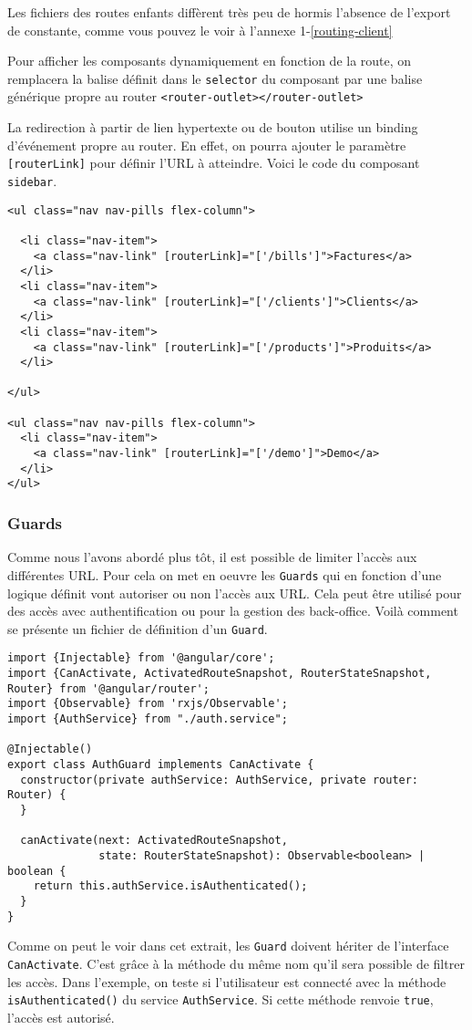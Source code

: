 \vspace{1.2ex}
Les fichiers des routes enfants diffèrent très peu de hormis l'absence de l'export de constante, comme vous pouvez le voir à l'annexe 1-\ref{routing-client}

Pour afficher les composants dynamiquement en fonction de la route, on remplacera la balise définit dans le \texttt{selector} du composant par une balise générique propre au router \texttt{<router-outlet></router-outlet>}

La redirection à partir de lien hypertexte ou de bouton utilise un binding d'événement propre au router. En effet, on pourra ajouter le paramètre \texttt{[routerLink]} pour définir l'URL à atteindre. Voici le code du composant \texttt{sidebar}.
\begin{lstlisting}[style=htmlcssjs, caption={routerLink}, label=routerLink]
<ul class="nav nav-pills flex-column">

  <li class="nav-item">
    <a class="nav-link" [routerLink]="['/bills']">Factures</a>
  </li>
  <li class="nav-item">
    <a class="nav-link" [routerLink]="['/clients']">Clients</a>
  </li>
  <li class="nav-item">
    <a class="nav-link" [routerLink]="['/products']">Produits</a>
  </li>

</ul>

<ul class="nav nav-pills flex-column">
  <li class="nav-item">
    <a class="nav-link" [routerLink]="['/demo']">Demo</a>
  </li>
</ul>\end{lstlisting}

\subsubsection{Guards}
Comme nous l'avons abordé plus tôt, il est possible de limiter l'accès aux différentes URL. Pour cela on met en oeuvre les \texttt{Guards} qui en fonction d'une logique définit vont autoriser ou non l'accès aux URL. Cela peut être utilisé pour des accès avec authentification ou pour la gestion des back-office. Voilà comment se présente un fichier de définition d'un \texttt{Guard}.
\begin{lstlisting}[style=htmlcssjs, caption={Guard}, label=guard]
import {Injectable} from '@angular/core';
import {CanActivate, ActivatedRouteSnapshot, RouterStateSnapshot, Router} from '@angular/router';
import {Observable} from 'rxjs/Observable';
import {AuthService} from "./auth.service";

@Injectable()
export class AuthGuard implements CanActivate {
  constructor(private authService: AuthService, private router: Router) {
  }

  canActivate(next: ActivatedRouteSnapshot,
              state: RouterStateSnapshot): Observable<boolean> | boolean {
    return this.authService.isAuthenticated();
  }
}
\end{lstlisting}
Comme on peut le voir dans cet extrait, les \texttt{Guard} doivent hériter de l'interface \texttt{CanActivate}. C'est grâce à la méthode du même nom qu'il sera possible de filtrer les accès. Dans l'exemple, on teste si l'utilisateur est connecté avec la méthode \texttt{isAuthenticated()} du service \texttt{AuthService}. Si cette méthode renvoie \texttt{true}, l'accès est autorisé.

